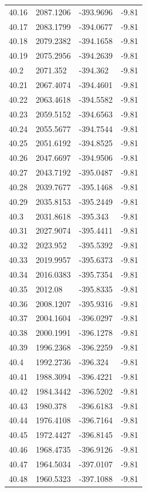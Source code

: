 \begin{table}[H]
\begin{tabular}{llll}
40.16 & 2087.1206 & -393.9696 & -9.81 \\
40.17 & 2083.1799 & -394.0677 & -9.81 \\
40.18 & 2079.2382 & -394.1658 & -9.81 \\
40.19 & 2075.2956 & -394.2639 & -9.81 \\
40.2 & 2071.352 & -394.362 & -9.81 \\
40.21 & 2067.4074 & -394.4601 & -9.81 \\
40.22 & 2063.4618 & -394.5582 & -9.81 \\
40.23 & 2059.5152 & -394.6563 & -9.81 \\
40.24 & 2055.5677 & -394.7544 & -9.81 \\
40.25 & 2051.6192 & -394.8525 & -9.81 \\
40.26 & 2047.6697 & -394.9506 & -9.81 \\
40.27 & 2043.7192 & -395.0487 & -9.81 \\
40.28 & 2039.7677 & -395.1468 & -9.81 \\
40.29 & 2035.8153 & -395.2449 & -9.81 \\
40.3 & 2031.8618 & -395.343 & -9.81 \\
40.31 & 2027.9074 & -395.4411 & -9.81 \\
40.32 & 2023.952 & -395.5392 & -9.81 \\
40.33 & 2019.9957 & -395.6373 & -9.81 \\
40.34 & 2016.0383 & -395.7354 & -9.81 \\
40.35 & 2012.08 & -395.8335 & -9.81 \\
40.36 & 2008.1207 & -395.9316 & -9.81 \\
40.37 & 2004.1604 & -396.0297 & -9.81 \\
40.38 & 2000.1991 & -396.1278 & -9.81 \\
40.39 & 1996.2368 & -396.2259 & -9.81 \\
40.4 & 1992.2736 & -396.324 & -9.81 \\
40.41 & 1988.3094 & -396.4221 & -9.81 \\
40.42 & 1984.3442 & -396.5202 & -9.81 \\
40.43 & 1980.378 & -396.6183 & -9.81 \\
40.44 & 1976.4108 & -396.7164 & -9.81 \\
40.45 & 1972.4427 & -396.8145 & -9.81 \\
40.46 & 1968.4735 & -396.9126 & -9.81 \\
40.47 & 1964.5034 & -397.0107 & -9.81 \\
40.48 & 1960.5323 & -397.1088 & -9.81 \\

\end{tabular}
\end{table}
